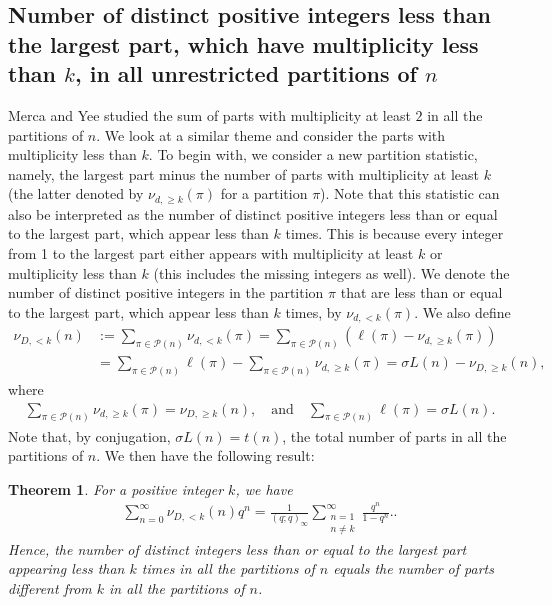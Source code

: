 \documentclass[12pt,reqno]{amsart}
\renewcommand{\(}{\left\(}
\renewcommand{\)}{\right\)}
\renewcommand{\[}{\left\[}
\renewcommand{\]}{\right\]}
\numberwithin{equation}{section}
\theoremstyle{plain}
\newtheorem{theorem}{Theorem}[section]
\begin{document}
\subsection{Number of distinct positive integers less than the largest part, which have multiplicity less than $k$, in all unrestricted partitions of $n$}
Merca and Yee \cite{MercaYee} studied the sum of parts with multiplicity at least $2$ in all the partitions of $n$. We look at a similar theme and consider the parts with multiplicity less than $k$. To begin with, we consider a new partition statistic, namely, the largest part minus the number of parts with multiplicity at least $k$ (the latter denoted by $\nu_{d,\geq k}(\pi)$ for a partition $\pi$). Note that this statistic can also be interpreted as the number of distinct positive integers less than or equal to the largest part, which appear less than $k$ times. This is because every integer from 1 to the largest part either appears with multiplicity at least $k$ or multiplicity less than $k$ (this includes the missing integers as well). We denote the number of distinct positive integers in the partition $\pi$ that are less than or equal to the largest part, which appear less than $k$ times, by $\nu_{d,<k}(\pi)$. We also define
\begin{align*}
\nu_{D,<k}(n)&:= \sum_{\pi \in \mathcal{P}(n)}\nu_{d,<k}(\pi)= \sum_{\pi \in \mathcal{P}(n)}(\ell(\pi) - \nu_{d,\geq k}(\pi)) \\
& = \sum_{\pi \in \mathcal{P}(n)} \ell(\pi) - \sum_{\pi \in \mathcal{P}(n)} \nu_{d,\geq k}(\pi) =   \sigma L(n)-\nu_{D,\geq k}(n),
\end{align*}
where
\begin{align*}
\sum_{\pi \in \mathcal{P}(n)}\nu_{d,\geq k}(\pi)=\nu_{D,\geq k}(n),  \quad \text{and} \quad \sum_{\pi \in \mathcal{P}(n)}\ell(\pi)=\sigma L(n).
\end{align*}
Note that, by conjugation, $\sigma L(n) = t(n)$, the total number of parts in all the partitions of $n$. We then have the following result:
\begin{theorem} \label{Multiplicity<k}
For a positive integer $k$, we have
\begin{align}
\sum_{n=0}^{\infty}\nu_{D,<k}(n)q^n=\frac{1}{(q;q)_{\infty}}\sum_{\substack{n=1\\ n \neq k}}^{\infty}\frac{q^n}{1-q^n}.
\label{QGFNmulti<k}.
\end{align}
Hence, the number of distinct integers less than or equal to the largest part appearing less than $k$ times in all the partitions of $n$ equals the number of parts different from $k$ in all the partitions of $n$.
\end{theorem}
\end{document}
